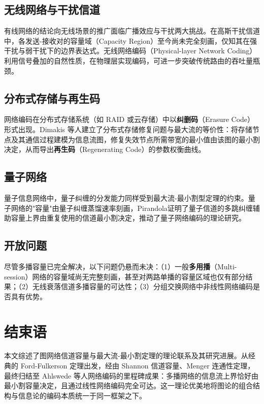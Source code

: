 \documentclass[12pt, a4paper]{article}
\begin{document}
\subsection{无线网络与干扰信道}

有线网络的结论向无线场景的推广面临广播效应与干扰两大挑战。在高斯干扰信道中，各发送-接收对的容量域（Capacity Region）至今尚未完全刻画，仅知其在强干扰\cite{carleial1975case}与弱干扰下的边界表达式。无线网络编码（Physical-layer Network Coding）利用信号叠加的自然性质，在物理层实现编码，可进一步突破传统路由的吞吐量瓶颈。

\subsection{分布式存储与再生码}

网络编码在分布式存储系统（如 RAID 或云存储）中以\textbf{纠删码}（Erasure Code）形式出现。Dimakis 等人\cite{dimakis2010network}建立了分布式存储修复问题与最大流的等价性：将存储节点及其通信过程建模为信息流图，修复失效节点所需带宽的最小值由该图的最小割决定，从而导出\textbf{再生码}（Regenerating Code）的参数权衡曲线。

\subsection{量子网络}

量子信息网络中，量子纠缠的分发能力同样受到最大流-最小割型定理的约束。量子网络的"容量"由量子纠缠蒸馏速率刻画，Pirandola\cite{pirandola2017fundamental}证明了量子信道的多跳纠缠辅助容量上界由重复使用的信道最小割决定，推动了量子网络编码的理论研究。

\subsection{开放问题}

尽管多播容量已完全解决，以下问题仍悬而未决：（1）一般\textbf{多用播}（Multi-session）网络的容量域尚无完整刻画，甚至对两路单播的容量区域也仅有部分结果\cite{harvey2006comparing}；（2）无线衰落信道多播容量的可达性；（3）分组交换网络中非线性网络编码是否具有优势。

\section{结\quad 束\quad 语}

本文综述了图网络信道容量与最大流-最小割定理的理论联系及其研究进展。从经典的 Ford-Fulkerson 定理出发，经由 Shannon 信道容量、Menger 连通性定理，最终归结至 Ahlswede 等人网络编码的里程碑成果：多播网络的信息流上界恰好由最小割容量决定，且通过线性网络编码完全可达。这一理论优美地将图论的组合结构与信息论的编码本质统一于同一框架之下。
\end{document}
